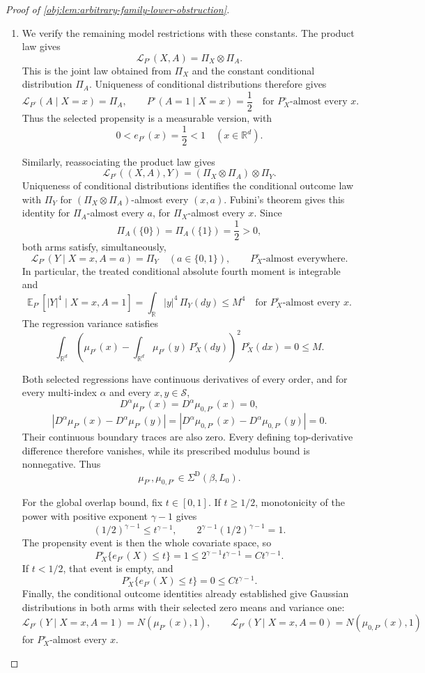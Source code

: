 \documentclass[11pt]{article}
\begin{document}
\begin{proof}[Proof of \cref{obj:lem:arbitrary-family-lower-obstruction}]
\begin{enumerate}
\item We verify the remaining model restrictions with these constants. The product law gives
\[
\mathcal L_{P^\circ}(X,A)=\Pi_X\otimes\Pi_A.
\]
This is the joint law obtained from \(\Pi_X\) and the constant conditional distribution \(\Pi_A\). Uniqueness of conditional distributions therefore gives
\[
\mathcal L_{P^\circ}(A\mid X=x)=\Pi_A,
\qquad
P^\circ(A=1\mid X=x)=\frac12
\quad\text{for }P_X^\circ\text{-almost every }x.
\]
Thus the selected propensity is a measurable version, with
\[
0<e_{P^\circ}(x)=\frac12<1
\quad (x\in\mathbb R^d).
\]

Similarly, reassociating the product law gives
\[
\mathcal L_{P^\circ}((X,A),Y)
=(\Pi_X\otimes\Pi_A)\otimes\Pi_Y.
\]
Uniqueness of conditional distributions identifies the conditional outcome law with \(\Pi_Y\) for \((\Pi_X\otimes\Pi_A)\)-almost every \((x,a)\). Fubini's theorem gives this identity for \(\Pi_A\)-almost every \(a\), for \(\Pi_X\)-almost every \(x\). Since
\[
\Pi_A(\{0\})=\Pi_A(\{1\})=\frac12>0,
\]
both arms satisfy, simultaneously,
\[
\mathcal L_{P^\circ}(Y\mid X=x,A=a)=\Pi_Y
\quad(a\in\{0,1\}),
\qquad
P_X^\circ\text{-almost everywhere}.
\]
In particular, the treated conditional absolute fourth moment is integrable and
\[
\mathbb E_{P^\circ}\!\left[|Y|^4\mid X=x,A=1\right]
=
\int_{\mathbb R}|y|^4\,\Pi_Y(dy)
\le M^4
\quad\text{for }P_X^\circ\text{-almost every }x.
\]
The regression variance satisfies
\[
\int_{\mathbb R^d}
\left(
\mu_{P^\circ}(x)
-\int_{\mathbb R^d}\mu_{P^\circ}(y)\,P_X^\circ(dy)
\right)^2P_X^\circ(dx)
=0\le M.
\]

Both selected regressions have continuous derivatives of every order, and for every multi-index \(\alpha\) and every \(x,y\in\mathcal S\),
\[
D^\alpha\mu_{P^\circ}(x)
=D^\alpha\mu_{0,P^\circ}(x)=0,
\]
\[
|D^\alpha\mu_{P^\circ}(x)-D^\alpha\mu_{P^\circ}(y)|
=
|D^\alpha\mu_{0,P^\circ}(x)-D^\alpha\mu_{0,P^\circ}(y)|
=0.
\]
Their continuous boundary traces are also zero. Every defining top-derivative difference therefore vanishes, while its prescribed modulus bound is nonnegative. Thus
\[
\mu_{P^\circ},\mu_{0,P^\circ}\in\Sigma^{\mathrm D}(\beta,L_0).
\]

For the global overlap bound, fix \(t\in[0,1]\). If \(t\ge1/2\), monotonicity of the power with positive exponent \(\gamma-1\) gives
\[
(1/2)^{\gamma-1}\le t^{\gamma-1},
\qquad
2^{\gamma-1}(1/2)^{\gamma-1}=1.
\]
The propensity event is then the whole covariate space, so
\[
P_X^\circ\{e_{P^\circ}(X)\le t\}
=1
\le 2^{\gamma-1}t^{\gamma-1}
=Ct^{\gamma-1}.
\]
If \(t<1/2\), that event is empty, and
\[
P_X^\circ\{e_{P^\circ}(X)\le t\}
=0\le Ct^{\gamma-1}.
\]
Finally, the conditional outcome identities already established give Gaussian distributions in both arms with their selected zero means and variance one:
\[
\mathcal L_{P^\circ}(Y\mid X=x,A=1)
=N(\mu_{P^\circ}(x),1),
\qquad
\mathcal L_{P^\circ}(Y\mid X=x,A=0)
=N(\mu_{0,P^\circ}(x),1)
\]
for \(P_X^\circ\)-almost every \(x\). %


\end{enumerate}
\end{proof}
\end{document}
